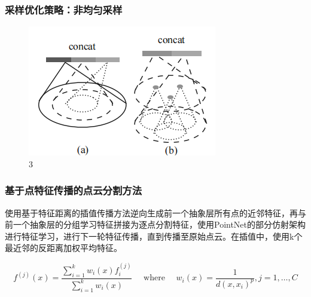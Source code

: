\begin{frame}
\frametitle{采样优化策略：非均匀采样}


\begin{figure}
\includegraphics[scale=0.7]{doc/img/f3.png}
\caption{3}
\end{figure}
    
    
\end{frame}


\begin{frame}
\frametitle{基于点特征传播的点云分割方法}
    
使用基于特征距离的插值传播方法逆向生成前一个抽象层所有点的近邻特征，再与前一个抽象层的分组学习特征拼接为逐点分割特征，使用PointNet的部分仿射架构进行特征学习，进行下一轮特征传播，直到传播至原始点云。在插值中，使用k个最近邻的反距离加权平均特征。


$$
f^{(j)}(x)=\frac{\sum_{i=1}^{k} w_{i}(x) f_{i}^{(j)}}{\sum_{i=1}^{k} w_{i}(x)} \quad \text { where } \quad w_{i}(x)=\frac{1}{d\left(x, x_{i}\right)^{p}}, j=1, \dots, C
$$


\end{frame}
